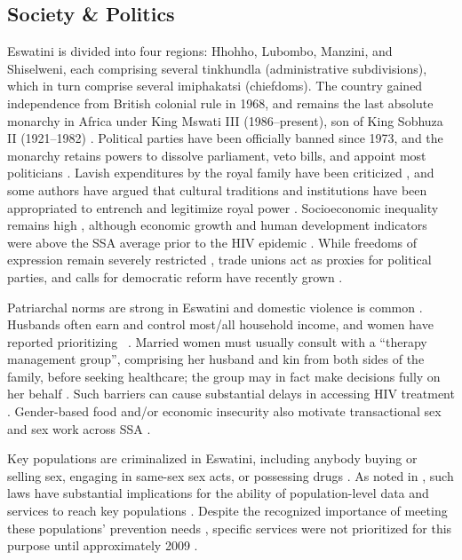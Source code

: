 \subsection{Society \& Politics}\label{intro.esw.soc}
Eswatini is divided into four regions: Hhohho, Lubombo, Manzini, and Shiselweni,
each comprising several tinkhundla (administrative subdivisions),
which in turn comprise several imiphakatsi (chiefdoms).
The country gained independence from British colonial rule in 1968,
and remains the last absolute monarchy in Africa
under King Mswati III (1986--present), son of King Sobhuza II (1921--1982) \cite{Mthembu2022}.
Political parties have been officially banned since 1973,
and the monarchy retains powers to
dissolve parliament, veto bills, and appoint most politicians \cite{Maphalala2021}.
Lavish expenditures by the royal family have been criticized \cite{Debly2014,Mthembu2022},
and some authors have argued that cultural traditions and institutions
have been appropriated to entrench and legitimize royal power \cite{Debly2014,Golomski2019}.
Socioeconomic inequality remains high \cite{Debly2014,Kali2023,DataBank},
although economic growth and human development indicators
were above the SSA average prior to the HIV epidemic \cite{Whiteside2007}.
While freedoms of expression remain severely restricted \cite{Debly2014,Mthembu2022},
trade unions act as proxies for political parties,
and calls for democratic reform have recently grown
\cite{Debly2014,Maphalala2021,Mthembu2022,Maseko2023}.
\par
Patriarchal norms are strong in Eswatini and domestic violence is common
\cite{Whiteside2003,Buseh2010,Simelane2011,Dlamini-Simelane2017,Golomski2019}.
Husbands often earn and control most/all household income, and women have reported prioritizing
~\cite{Dlamini-Simelane2017}.
Married women must usually consult with a ``therapy management group'',
comprising her husband and kin from both sides of the family, before seeking healthcare;
the group may in fact make decisions fully on her behalf \cite{Dlamini-Simelane2017}.
Such barriers can cause substantial delays in accessing HIV treatment \cite{Dlamini-Simelane2017}.
Gender-based food and/or economic insecurity also motivate
transactional sex and sex work across SSA \cite{Scorgie2012}.
\par
Key populations are criminalized in Eswatini, including anybody
buying or selling sex, engaging in same-sex sex acts, or possessing drugs \cite{UNAIDS2022lpa}.
As noted in , such laws have substantial implications for
the ability of population-level data and services to reach key populations \cite{WHO2016kp}.
Despite the recognized importance of meeting these populations' prevention needs \cite{EswBSS2002},
specific services were not prioritized for this purpose until approximately 2009 \cite{NERCHA2009}.
\pagebreak %
